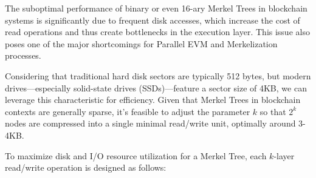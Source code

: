 The suboptimal performance of binary or even 16-ary Merkel Trees in blockchain systems is significantly due to frequent disk accesses, which increase the cost of read operations and thus create bottlenecks in the execution layer. This issue also poses one of the major shortcomings for Parallel EVM and Merkelization processes.

Considering that traditional hard disk sectors are typically 512 bytes, but modern drives—especially solid-state drives (SSDs)—feature a sector size of 4KB, we can leverage this characteristic for efficiency. Given that Merkel Trees in blockchain contexts are generally sparse, it's feasible to adjust the parameter $k$ so that $2^k$ nodes are compressed into a single minimal read/write unit, optimally around 3-4KB.

To maximize disk and I/O resource utilization for a Merkel Tree, each $k$-layer read/write operation is designed as follows:

